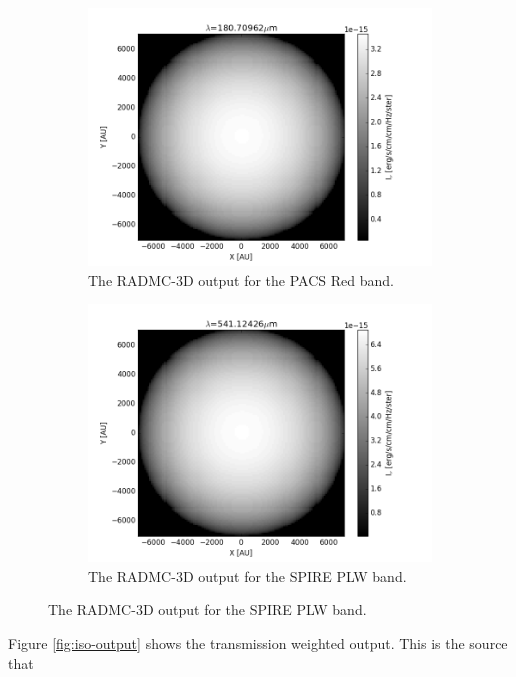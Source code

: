 \documentclass{report}
\begin{document}
\begin{figure}
\begin{subfigure}[b]{.45\linewidth}
\includegraphics[width=\linewidth]{../img/output/red.png}
\caption{The RADMC-3D output for the PACS Red band.}\label{fig:iso-red}
\end{subfigure}
\begin{subfigure}[b]{.45\linewidth}
\includegraphics[width=\linewidth]{../img/output/plw.png}
\caption{The RADMC-3D output for the SPIRE PLW band.}\label{fig:iso-plw}
\end{subfigure}

\end{figure} \label{fig:iso-output}

Figure \ref{fig:iso-output} shows the transmission weighted output. This is the source that 
\end{document}
